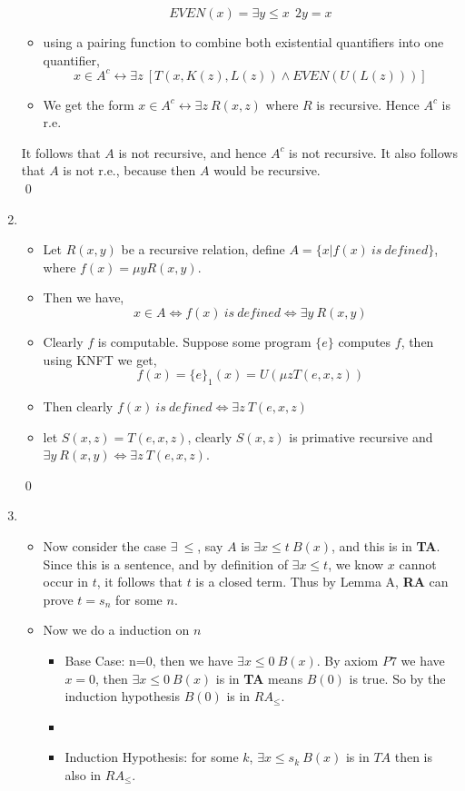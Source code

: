 \documentclass[11pt,twoside]{article}
\begin{document}
\begin{enumerate}[leftmargin=0pt]
\begin{itemize}[label = {}]
		\[ EVEN(x) = \exists y\leq x \ \ 2y = x\]
	\item using a pairing function  to combine both existential quantifiers into one quantifier,
		\[ x \in A^c \leftrightarrow \exists z \ [T(x,K(z),L(z)) \wedge EVEN( U(L(z)) )]\]
	\item We get the form $x \in A^c \leftrightarrow \exists z \ R(x,z)$ where $R$ is recursive. Hence $A^c$ is r.e. 
	\end{itemize}
	It follows that $A$ is not recursive, and hence $A^c$ is not recursive. It also follows that $A$ is not r.e., because then  $A$ would be recursive. \\
\qed
\item {}
	\begin{itemize}[label ={}]
		\item Let $R(x,y)$ be a recursive relation, define $A = \{x|f(x) \ is \ defined\}$, where $f(x) = \mu y R(x,y)$.
		\item Then we have,
			 \[x \in A \iff f(x) \ is \ defined \iff  \exists y \ R(x,y)\]
		\item	 Clearly $f$ is computable. Suppose some program $\{e\}$ computes $f$, then using KNFT we get,
			\[f(x) = \{e\}_1(x) = U(\mu z T(e,x,z))\]
		\item Then clearly $ f(x) \ is \ defined \iff  \exists z \ T(e,x,z)$
		\item let $S(x,z) = T(e,x,z)$, clearly $S(x,z) $ is primative recursive and $ \exists y \ R(x,y) \iff  \exists z \ T(e,x,z)$.
	\end{itemize}
\qed
\item {}
	\begin{itemize}[label ={}]
		\item Now consider the case $\exists \ \leq$, say $A $ is $\exists x\leq t \ B(x)$, and this is in \textbf{TA}. Since this is a sentence, and by definition of  $\exists x\leq t$, we know $x$ cannot occur in $t$, it follows that $t$ is a closed term. Thus by Lemma A, \textbf{RA} can prove $t = s_n$ for some $n$.
		\item Now we do a induction on $n$
			\begin{itemize}[label ={}]
				\item  Base Case: n=0, then we have $\exists x\leq 0 \ B(x)$. By axiom $P7$ we have
				$x = 0$, then $\exists x\leq 0 \ B(x)$ is in \textbf{TA} means $B(0)$ is true. So by the induction hypothesis $B(0)$ is in \textbf{$RA_\leq$}. 
				\item
				\item Induction Hypothesis: for some $k$, $\exists x\leq s_k \ B(x)$ is in $TA$ then is also in \textbf{$RA_\leq$}.

\end{itemize}
\end{itemize}
\end{enumerate}
\end{document}
